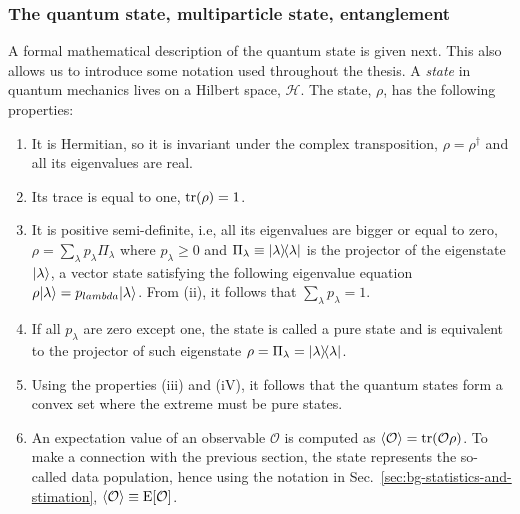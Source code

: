 \subsubsection{The quantum state, multiparticle state, entanglement}
\label{sec:bg-the-quantu-state}

A formal mathematical description of the quantum state is given next.
This also allows us to introduce some notation used throughout the thesis.
A \emph{state} in quantum mechanics lives on a Hilbert space, $\mathcal{H}$.
The state, $\rho$, has the following properties:
\begin{enumerate}
  \item
  It is Hermitian, so it is invariant under the complex transposition, $\rho=\rho^\dagger$ and all its eigenvalues are real.
  \item Its trace is equal to one, $\operatorname{tr}(\rho)=1$.
  \item It is positive semi-definite, i.e, all its eigenvalues are bigger or equal to zero, $\rho=\sum_{\lambda}p_\lambda \Pi_\lambda$ where $p_\lambda\geq 0$ and $\Pi_\lambda\equiv\vert \lambda \rangle \! \langle \lambda \vert$ is the projector of the eigenstate $\vert \lambda \rangle$, a vector state satisfying the following eigenvalue equation $\rho\vert \lambda \rangle=p_{lambda}\vert \lambda \rangle$.
  From (ii), it follows that $\sum_\lambda p_\lambda = 1$.
  \item If all $p_\lambda$ are zero except one, the state is called a pure state and is equivalent to the projector of such eigenstate $\rho=\Pi_\lambda=\vert \lambda \rangle \! \langle \lambda \vert$.
  \item Using the properties (iii) and (iV), it follows that the quantum states form a convex set where the extreme must be pure states.
  \item An expectation value of an observable $\mathcal{O}$ is computed as $\langle \mathcal{O} \rangle=\operatorname{tr}(\mathcal{O}\rho)$.
  To make a connection with the previous section, the state represents the so-called data population, hence using the notation in Sec.~\ref{sec:bg-statistics-and-stimation},  $\langle \mathcal{O} \rangle\equiv\text{E}[\mathcal{O}]$.
\end{enumerate}

